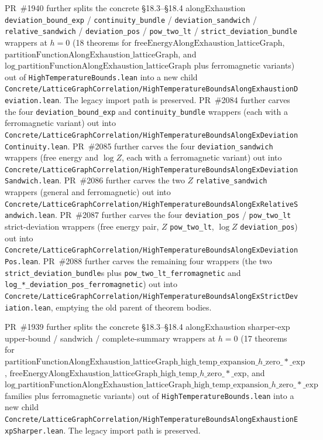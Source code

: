 \documentclass[a4paper,11pt]{article}
\begin{document}
PR~\#1940 further splits the concrete §18.3--§18.4 alongExhaustion
\texttt{deviation\_bound\_exp} / \texttt{continuity\_bundle} /
\texttt{deviation\_sandwich} / \texttt{relative\_sandwich} /
\texttt{deviation\_pos} / \texttt{pow\_two\_lt} /
\texttt{strict\_deviation\_bundle} wrappers at $h = 0$ (18 theorems for
$\mathrm{freeEnergyAlongExhaustion}\_\mathrm{latticeGraph}$,
$\mathrm{partitionFunctionAlongExhaustion}\_\mathrm{latticeGraph}$, and
$\mathrm{log}\_\mathrm{partitionFunctionAlongExhaustion}\_\mathrm{latticeGraph}$
plus ferromagnetic variants) out of
\texttt{HighTemperatureBounds.lean} into a new child
\texttt{Concrete/LatticeGraphCorrelation/HighTemperatureBoundsAlongExhaustionDeviation.lean}.
The legacy import path is preserved. PR~\#2084 further carves the four
\texttt{deviation\_bound\_exp} and \texttt{continuity\_bundle} wrappers
(each with a ferromagnetic variant) out into
\texttt{Concrete/LatticeGraphCorrelation/HighTemperatureBoundsAlongExDeviationContinuity.lean}.
PR~\#2085 further carves the four \texttt{deviation\_sandwich} wrappers
(free energy and $\log Z$, each with a ferromagnetic variant) out into
\texttt{Concrete/LatticeGraphCorrelation/HighTemperatureBoundsAlongExDeviationSandwich.lean}.
PR~\#2086 further carves the two $Z$ \texttt{relative\_sandwich}
wrappers (general and ferromagnetic) out into
\texttt{Concrete/LatticeGraphCorrelation/HighTemperatureBoundsAlongExRelativeSandwich.lean}.
PR~\#2087 further carves the four \texttt{deviation\_pos} /
\texttt{pow\_two\_lt} strict-deviation wrappers (free energy pair, $Z$
\texttt{pow\_two\_lt}, $\log Z$ \texttt{deviation\_pos}) out into
\texttt{Concrete/LatticeGraphCorrelation/HighTemperatureBoundsAlongExDeviationPos.lean}.
PR~\#2088 further carves the remaining four wrappers
(the two \texttt{strict\_deviation\_bundle}s plus
\texttt{pow\_two\_lt\_ferromagnetic} and
\texttt{log\_*\_deviation\_pos\_ferromagnetic}) out into
\texttt{Concrete/LatticeGraphCorrelation/HighTemperatureBoundsAlongExStrictDeviation.lean},
emptying the old parent of theorem bodies.

PR~\#1939 further splits the concrete §18.3--§18.4 alongExhaustion
sharper-exp upper-bound / sandwich / complete-summary wrappers at
$h = 0$ (17 theorems for
$\mathrm{partitionFunctionAlongExhaustion}\_\mathrm{latticeGraph}\_\mathrm{high}\_\mathrm{temp}\_\mathrm{expansion}\_h\_\mathrm{zero}\_*\_\mathrm{exp}$,
$\mathrm{freeEnergyAlongExhaustion}\_\mathrm{latticeGraph}\_\mathrm{high}\_\mathrm{temp}\_h\_\mathrm{zero}\_*\_\mathrm{exp}$, and
$\mathrm{log}\_\mathrm{partitionFunctionAlongExhaustion}\_\mathrm{latticeGraph}\_\mathrm{high}\_\mathrm{temp}\_\mathrm{expansion}\_h\_\mathrm{zero}\_*\_\mathrm{exp}$
families plus ferromagnetic variants) out of
\texttt{HighTemperatureBounds.lean} into a new child
\texttt{Concrete/LatticeGraphCorrelation/HighTemperatureBoundsAlongExhaustionExpSharper.lean}.
The legacy import path is preserved.
\end{document}
